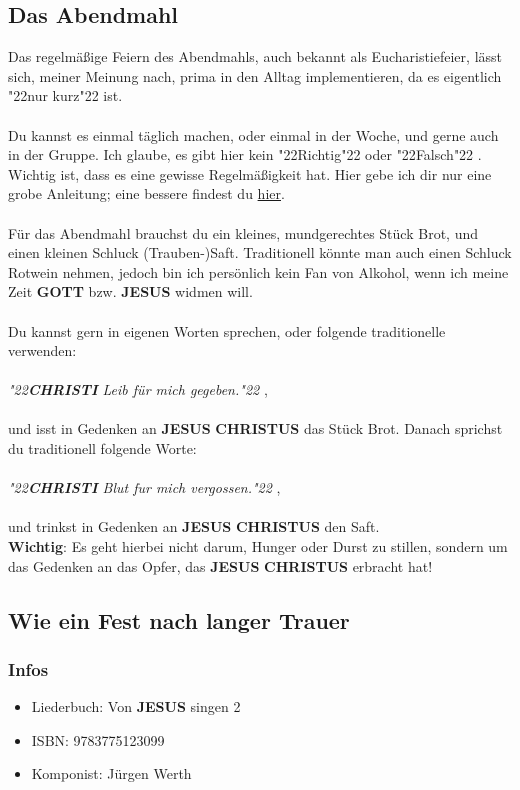\documentclass[12pt,a5paper]{article}
\newcommand{\Christi}[0]{\textbf{CHRISTI}}
\newcommand{\Christus}[0]{\textbf{CHRISTUS}}
\newcommand{\Gott}[0]{\textbf{GOTT}}
\newcommand{\Jesus}[0]{\textbf{JESUS}}
\newcommand{\q}[1]{\char"22{#1}\char"22 }
\begin{document}
	\subsection{Das Abendmahl}
		Das regelm\"a{\ss}ige Feiern des Abendmahls,
		auch bekannt als Eucharistiefeier,
		l\"asst sich,
		meiner Meinung nach,
		prima in den Alltag implementieren,
		da es eigentlich \q{nur kurz} ist.
		\\
		\\
		Du kannst es einmal t\"aglich machen,
		oder einmal in der Woche,
		und gerne auch in der Gruppe.
		Ich glaube,
		es gibt hier kein \q{Richtig} oder \q{Falsch}.
		Wichtig ist,
		dass es eine gewisse Regelm\"a{\ss}igkeit hat.
		Hier gebe ich dir nur eine grobe Anleitung;
		eine bessere findest du \href{https://www.youtube.com/watch?v=8iCgvvpLhvM}{hier}.
		\\
		\\
		F\"ur das Abendmahl brauchst du ein kleines,
		mundgerechtes St\"uck Brot,
		und einen kleinen Schluck (Trauben-)Saft.
		Traditionell k\"onnte man auch einen Schluck Rotwein nehmen,
		jedoch bin ich pers\"onlich kein Fan von Alkohol,
		wenn ich meine Zeit {\Gott} bzw. {\Jesus} widmen will.
		\\
		\\
		Du kannst gern in eigenen Worten sprechen,
		oder folgende traditionelle verwenden:
		\\
		\\
		\textit{\q{{\Christi} Leib f\"ur mich gegeben.}},
		\\
		\\
		und isst in Gedenken an {\Jesus} {\Christus} das St\"uck Brot.
		Danach sprichst du traditionell folgende Worte:
		\\
		\\
		\textit{\q{{\Christi} Blut fur mich vergossen.}},
		\\
		\\
		und trinkst in Gedenken an {\Jesus} {\Christus} den Saft.
		\\
		\textbf{Wichtig}:
		Es geht hierbei nicht darum,
		Hunger oder Durst zu stillen,
		sondern um das Gedenken an das Opfer,
		das {\Jesus} {\Christus} erbracht hat!
		
	\subsection{Wie ein Fest nach langer Trauer}
		\subsubsection{Infos}
			\begin{itemize}[nosep]
				\item Liederbuch: Von {\Jesus} singen 2
				\item ISBN: 9783775123099
				\item Komponist: J\"urgen Werth
			\end{itemize}
		
\end{document}
